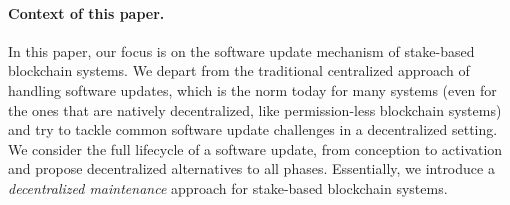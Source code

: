 \paragraph{Context of this paper.}
In this paper, our focus is on the software update mechanism of stake-based blockchain systems. We depart from the traditional centralized approach of handling software updates, which is the norm today for many systems (even for the ones that are natively decentralized, like permission-less blockchain systems) and try to tackle common software update challenges in a decentralized setting. We consider the full lifecycle of a software update, from conception to activation and propose decentralized alternatives to all phases. Essentially, we introduce a \emph{decentralized maintenance} approach for stake-based blockchain systems.



